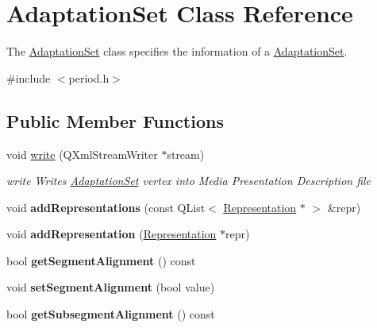 \hypertarget{class_adaptation_set}{\section{Adaptation\-Set Class Reference}
\label{class_adaptation_set}
}


The \hyperlink{class_adaptation_set}{Adaptation\-Set} class specifies the information of a \hyperlink{class_adaptation_set}{Adaptation\-Set}.  




{\ttfamily \#include $<$period.\-h$>$}

\subsection*{Public Member Functions}
\begin{DoxyCompactItemize}
\item 
void \hyperlink{class_adaptation_set_a0b84ce665a576038c44a4094a0e6a8f6}{write} (Q\-Xml\-Stream\-Writer $\ast$stream)
\begin{DoxyCompactList}\small\item\em write Writes \hyperlink{class_adaptation_set}{Adaptation\-Set} vertex into Media Presentation Description file \end{DoxyCompactList}\item 
\hypertarget{class_adaptation_set_a73144f3a3eb7f75c34fa130af84ee642}{void {\bfseries add\-Representations} (const Q\-List$<$ \hyperlink{class_representation}{Representation} $\ast$ $>$ \&repr)}\label{class_adaptation_set_a73144f3a3eb7f75c34fa130af84ee642}

\item 
\hypertarget{class_adaptation_set_ab7cd1bdcc0574f6807370f5e335338ea}{void {\bfseries add\-Representation} (\hyperlink{class_representation}{Representation} $\ast$repr)}\label{class_adaptation_set_ab7cd1bdcc0574f6807370f5e335338ea}

\item 
\hypertarget{class_adaptation_set_a415baf1e615a0484291cee992e140016}{bool {\bfseries get\-Segment\-Alignment} () const }\label{class_adaptation_set_a415baf1e615a0484291cee992e140016}

\item 
\hypertarget{class_adaptation_set_a2de7dde364556d07cef9f93877cb7f45}{void {\bfseries set\-Segment\-Alignment} (bool value)}\label{class_adaptation_set_a2de7dde364556d07cef9f93877cb7f45}

\item 
\hypertarget{class_adaptation_set_a56be7033dc336bf4148b867604e87431}{bool {\bfseries get\-Subsegment\-Alignment} () const }\label{class_adaptation_set_a56be7033dc336bf4148b867604e87431}


\end{DoxyCompactItemize}
